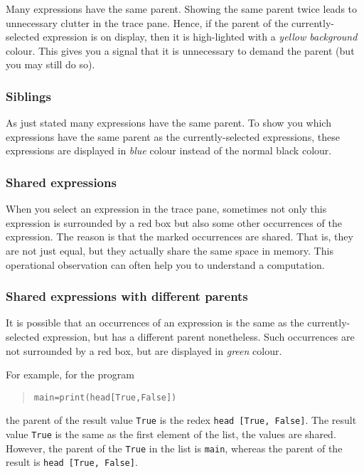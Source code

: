\documentclass[12pt]{article}
\newenvironment{code}{\begin{quote}\begin{alltt}}{\end{alltt}\end{quote}}
\begin{document}
Many expressions have the same parent. Showing the same parent twice leads to unnecessary clutter in the trace pane. Hence, if the parent of the currently-selected expression is on display, then it is high-lighted with a \emph{yellow background} colour. This gives you a signal that it is unnecessary to demand the parent (but you may still do so).

\subsubsection{Siblings}

As just stated many expressions have the same parent. To show you which expressions have the same parent as the currently-selected expressions, these expressions are displayed in \emph{blue} colour instead of the normal black colour.

\subsubsection{Shared expressions}

When you select an expression in the trace pane, sometimes not only this expression is surrounded by a red box but also some other occurrences of the expression.
The reason is that the marked occurrences are shared. That is, they are not just equal, but they actually share the same space in memory.
This operational observation can often help you to understand a computation.

\subsubsection{Shared expressions with different parents}

It is possible that an occurrences of an expression is the same as the currently-selected expression, but has a different parent nonetheless. Such occurrences are not surrounded by a red box, but are displayed in \emph{green} colour.

For example, for the program
\begin{code}
main = print (head [True, False])
\end{code}
the parent of the result value \texttt{True} is the redex
\texttt{head [True, False]}. The result value \texttt{True} is the same as the first element of the list, the values are shared. However, the parent of the \texttt{True} in the list is \texttt{main}, whereas the parent of the result is \texttt{head [True, False]}.
\end{document}
